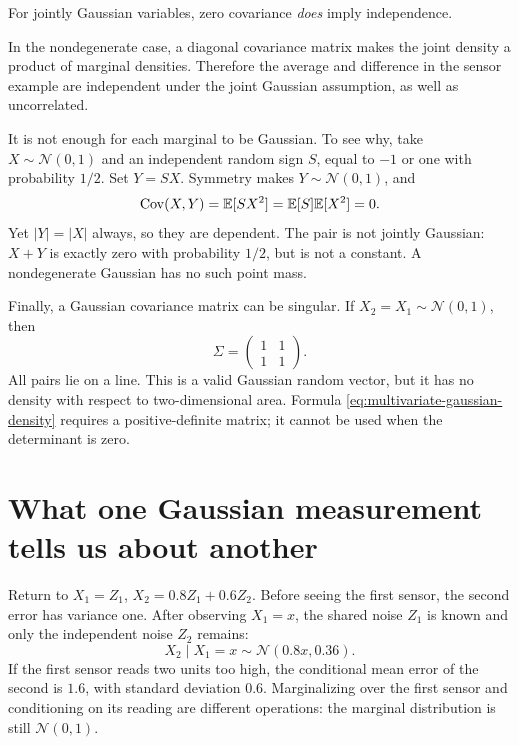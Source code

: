 \begin{result}
For jointly Gaussian variables, zero covariance \emph{does} imply
independence.
\end{result}
In the nondegenerate case, a diagonal covariance matrix
makes the joint density a product of marginal densities. Therefore the
average and difference in the sensor example are independent under
the joint Gaussian assumption, as well as uncorrelated.

It is not enough for each marginal to be Gaussian. To see why, take
\(X\sim\mathcal N(0,1)\) and an independent random sign \(S\), equal to
\(-1\) or one with probability \(1/2\). Set \(Y=SX\). Symmetry makes
\(Y\sim\mathcal N(0,1)\), and
\[
  \operatorname{Cov}(X,Y)=\mathbb{E}[SX^2]=\mathbb{E}[S]\mathbb{E}[X^2]=0.
\]
Yet \(|Y|=|X|\) always, so they are dependent. The pair is not jointly
Gaussian: \(X+Y\) is exactly zero with probability \(1/2\), but is not
a constant. A nondegenerate Gaussian has no such point mass.

Finally, a Gaussian covariance matrix can be singular. If
\(X_2=X_1\sim\mathcal N(0,1)\), then
\[
  \Sigma=\begin{pmatrix}1&1\\1&1\end{pmatrix}.
\]
All pairs lie on a line. This is a valid Gaussian random vector, but it
has no density with respect to two-dimensional area. Formula
\eqref{eq:multivariate-gaussian-density} requires a positive-definite
matrix; it cannot be used when the determinant is zero.

\section{What one Gaussian measurement tells us about another}
\label{sec:conditional-gaussian}

Return to \(X_1=Z_1\), \(X_2=0.8Z_1+0.6Z_2\). Before seeing the
first sensor, the second error has variance one. After observing
\(X_1=x\), the shared noise \(Z_1\) is known and only the independent
noise \(Z_2\) remains:
\[
  X_2\mid X_1=x\sim\mathcal N(0.8x,0.36).
\]
If the first sensor reads two units too high, the conditional mean
error of the second is \(1.6\), with standard deviation \(0.6\).
Marginalizing over the first sensor and conditioning on its reading are
different operations: the marginal distribution is still
\(\mathcal N(0,1)\).

